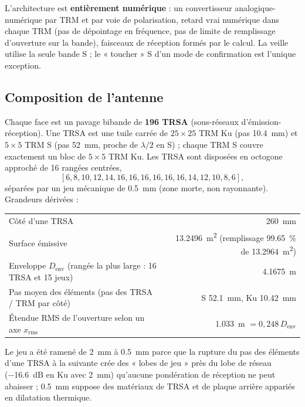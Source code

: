 \documentclass[11pt,a4paper]{article}
\newcommand{\Denv}{D_{\mathrm{env}}}
\begin{document}
L'architecture est \textbf{entièrement numérique} : un convertisseur analogique-numérique par TRM et par voie de
polarisation, retard vrai numérique dans chaque TRM (pas de dépointage en fréquence, pas de limite de remplissage
d'ouverture sur la bande), faisceaux de réception formés par le calcul. La veille utilise la seule bande S ; le
« toucher » S d'un mode de confirmation est l'unique exception.

\subsection{Composition de l'antenne}
Chaque face est un pavage bibande de \textbf{196 TRSA} (sous-réseaux d'émission-réception). Une TRSA est une tuile
carrée de $25\times25$ TRM Ku (pas \SI{10.4}{mm}) et $5\times5$ TRM S (pas \SI{52}{mm}, proche de $\lambda/2$ en S) ;
chaque TRM S couvre exactement un bloc de $5\times5$ TRM Ku. Les TRSA sont disposées en octogone approché de 16 rangées
centrées,
\[
  [6, 8, 10, 12, 14, 16, 16, 16, 16, 16, 16, 14, 12, 10, 8, 6],
\]
séparées par un jeu mécanique de \SI{0.5}{mm} (zone morte, non rayonnante). Grandeurs dérivées :
\begin{center}
\begin{tabularx}{\linewidth}{@{}Lr@{}}
\toprule
Côté d'une TRSA & \SI{260}{mm}\\
Surface émissive & \SI{13.2496}{m^2} (remplissage \SI{99.65}{\percent} de \SI{13.2964}{m^2})\\
Enveloppe $\Denv$ (rangée la plus large : 16 TRSA et 15 jeux) & \SI{4.1675}{m}\\
Pas moyen des éléments (pas des TRSA / TRM par côté) & S \SI{52.1}{mm}, Ku \SI{10.42}{mm}\\
Étendue RMS de l'ouverture selon un axe $x_{\mathrm{rms}}$ & \SI{1.033}{m} $= 0,248\,\Denv$\\
\bottomrule
\end{tabularx}
\end{center}
Le jeu a été ramené de \SI{2}{mm} à \SI{0.5}{mm} parce que la rupture du pas des éléments d'une TRSA à la suivante crée
des « lobes de jeu » près du lobe de réseau (\SI{-16.6}{dB} en Ku avec \SI{2}{mm}) qu'aucune pondération de réception ne
peut abaisser ; \SI{0.5}{mm} suppose des matériaux de TRSA et de plaque arrière appariés en dilatation thermique.
\end{document}
